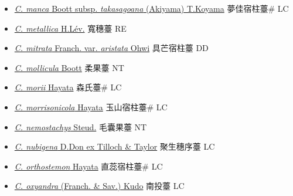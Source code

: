 \begin{itemize}
\begin{itemize}
        \item[] \href{http://www.theplantlist.org/tpl1.1/search?q=Carex+manca+subsp.+takasagoana}{\textit{C. manca} Boott subsp. \textit{takasagoana} (Akiyama) T.Koyama}   夢佳宿柱薹\# LC
        \item[] \href{http://www.theplantlist.org/tpl1.1/search?q=Carex+metallica}{\textit{C. metallica} H.Lév.}   寬穗薹 RE
        \item[] \href{http://www.theplantlist.org/tpl1.1/search?q=Carex+mitrata+var.+aristata}{\textit{C. mitrata} Franch. var. \textit{aristata} Ohwi}   具芒宿柱薹 DD
        \item[] \href{http://www.theplantlist.org/tpl1.1/search?q=Carex+mollicula}{\textit{C. mollicula} Boott}   柔果薹 NT
        \item[] \href{http://www.theplantlist.org/tpl1.1/search?q=Carex+morii}{\textit{C. morii} Hayata}   森氏薹\# LC
        \item[] \href{http://www.theplantlist.org/tpl1.1/search?q=Carex+morrisonicola}{\textit{C. morrisonicola} Hayata}   玉山宿柱薹\# LC
        \item[] \href{http://www.theplantlist.org/tpl1.1/search?q=Carex+nemostachys}{\textit{C. nemostachys} Steud.}   毛囊果薹 NT
        \item[] \href{http://www.theplantlist.org/tpl1.1/search?q=Carex+nubigena}{\textit{C. nubigena} D.Don ex Tilloch \& Taylor}   聚生穗序薹 LC
        \item[] \href{http://www.theplantlist.org/tpl1.1/search?q=Carex+orthostemon}{\textit{C. orthostemon} Hayata}   直蕊宿柱薹\# LC
        \item[] \href{http://www.theplantlist.org/tpl1.1/search?q=Carex+oxyandra}{\textit{C. oxyandra} (Franch. \& Sav.) Kudo}   南投薹 LC

\end{itemize}
\end{itemize}
